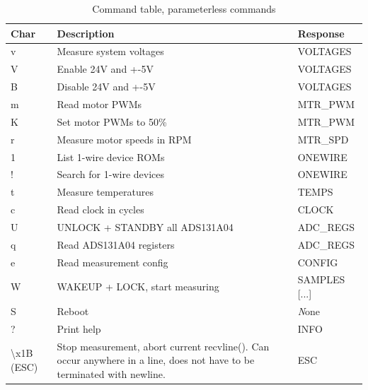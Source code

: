 \documentclass{article}
\begin{document}

\begin{table}[H]
\begin{centering}
\begin{tabular}{|p{1.0cm}|p{7.8cm}|p{2.0cm}|}
\hline
{\bf Char} & {\bf Description}    & {\bf Response}\\ \hline
v & Measure system voltages       & VOLTAGES      \\ \hline
V & Enable 24V and +-5V           & VOLTAGES      \\ \hline
B & Disable 24V and +-5V          & VOLTAGES      \\ \hline
m & Read motor PWMs               & MTR\_PWM      \\ \hline
K & Set motor PWMs to 50\%        & MTR\_PWM      \\ \hline
r & Measure motor speeds in RPM   & MTR\_SPD      \\ \hline
1 & List 1-wire device ROMs       & ONEWIRE       \\ \hline
! & Search for 1-wire devices     & ONEWIRE       \\ \hline
t & Measure temperatures          & TEMPS         \\ \hline
c & Read clock in cycles          & CLOCK         \\ \hline
U & UNLOCK + STANDBY all ADS131A04& ADC\_REGS     \\ \hline
q & Read ADS131A04 registers      & ADC\_REGS     \\ \hline
e & Read measurement config       & CONFIG        \\ \hline
W & WAKEUP + LOCK, start measuring& SAMPLES [...] \\ \hline
S & Reboot                        & {\emph None}  \\ \hline
? & Print help                    & INFO          \\ \hline
{\textbackslash}x1B (ESC)  &   Stop measurement, abort current recvline().
Can occur anywhere in a line, does not have to be terminated with newline. & ESC \\ \hline
\end{tabular}
\caption{Command table, parameterless commands}
\label{command_table_0}
\end{centering}
\end{table}
\end{document}
